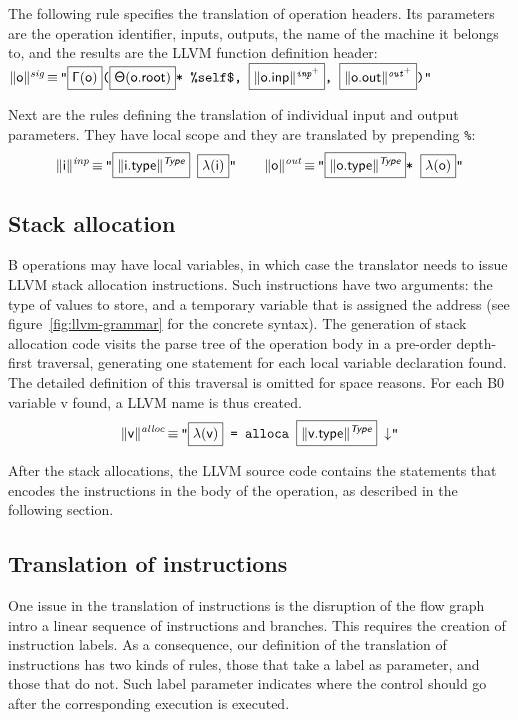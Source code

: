 \documentclass{llncs}
\newcommand{\trad}[2]{\ensuremath{\lVert \textsf{#1} \rVert^{\textit{#2}}}}
\newcommand{\nl}[0]{\ensuremath{\downarrow}}
\DeclareMathOperator{\isdef}{\equiv}
\newcommand{\llvm}[1]{\texttt{#1}}
\newcommand{\B}[1]{\textsf{#1}}
\newcommand{\ListOf}[1]{$\mbox{#1}^+$}
\newcommand{\PH}[1]{\framebox{$#1$}}
\newcommand{\Global}[0]{\ensuremath{\sf\Gamma}}
\newcommand{\local}[0]{\ensuremath{\sf\lambda}}
\newcommand{\state}[0]{\ensuremath{\sf\Theta}}
\begin{document}
The following rule specifies the translation of operation headers. Its
parameters are the operation identifier, inputs, outputs, the name of the
machine it belongs to, and the results are the LLVM function definition
header: \\
\noindent$\trad{\B{o}}{sig} \isdef \llvm{"\PH{\Global(\B{o})}(\PH{\state(\B{o.root})}* \%self\$, \PH{\trad{\B{o.inp}}{\ListOf{inp}}}, \PH{\trad{\B{o.out}}{\ListOf{out}}})"}$

Next are the rules defining the translation of individual input and output
parameters. They have local scope and they are translated by prepending
\llvm{\%}:
\begin{align*}
  \trad{i}{inp} \isdef
  \llvm{"\PH{\trad{i.type}{\B{Type}}} \PH{\local(\B{i})}"} \quad \quad
  \trad{o}{out} \isdef
  \llvm{"\PH{\trad{o.type}{\B{Type}}}* \PH{\local(\B{o})}"}
\end{align*}

\subsection{Stack allocation}
\label{sec:trad-alloc}

B operations may have local variables, in which case the translator needs to
issue LLVM stack allocation instructions. Such instructions have two arguments:
the type of values to store, and a temporary variable that is assigned the
address (see figure~\ref{fig:llvm-grammar} for the concrete syntax). The
generation of stack allocation code visits the parse tree of the operation body
in a pre-order depth-first traversal, generating one statement for each local
variable declaration found. The detailed definition of this traversal is omitted
for space reasons. For each B0 variable \B{v} found, a LLVM name is thus
created.
\begin{align*}
  \trad{v}{alloc} \isdef
  \llvm{"\PH{\local(\B{v})} = alloca \PH{\trad{v.type}{\B{Type}}} \nl"}
\end{align*}

After the stack allocations, the LLVM source code contains the statements that
encodes the instructions in the body of the operation, as described in the
following section.

\subsection{Translation of instructions}
\label{sec:trad-instr}

One issue in the translation of instructions is the disruption of the flow graph
intro a linear sequence of instructions and branches. This requires the creation
of instruction labels. As a consequence, our definition of the translation of
instructions has two kinds of rules, those that take a label as parameter, and
those that do not. Such label parameter indicates where the control should go
after the corresponding execution is executed.
\end{document}
